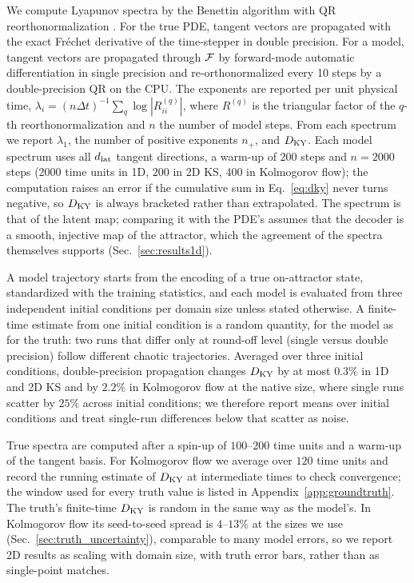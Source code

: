 We compute Lyapunov spectra by the Benettin algorithm with QR
reorthonormalization \citep{benettin1980}. For the true PDE, tangent
vectors are propagated with the exact Fr\'echet derivative of the
time-stepper in double precision. For a model, tangent vectors are
propagated through $\mathcal{F}$ by forward-mode automatic differentiation in
single precision and re-orthonormalized every 10 steps by a
double-precision QR on the CPU. The exponents are reported per unit
physical time, $\lambda_i = (n\Delta t)^{-1}\sum_{q}\log|R^{(q)}_{ii}|$,
where $R^{(q)}$ is the triangular factor of the $q$-th reorthonormalization
and $n$ the number of model steps. From each spectrum we report
$\lambda_1$, the number of positive exponents $n_+$, and $D_{\mathrm{KY}}$. Each
model spectrum uses all $d_{\mathrm{lat}}$
tangent directions, a warm-up of 200 steps and $n=2000$ steps (2000 time
units in 1D, 200 in 2D KS, 400 in Kolmogorov flow); the computation
raises an error if the cumulative sum in Eq.~\eqref{eq:dky} never turns
negative, so $D_{\mathrm{KY}}$ is always bracketed rather than extrapolated. The
spectrum is that of the latent map; comparing it with the PDE's assumes
that the decoder is a smooth, injective map of the attractor, which the
agreement of the spectra themselves supports (Sec.~\ref{sec:results1d}).

A model trajectory starts from the encoding of a true on-attractor
state, standardized with the training statistics, and each model is
evaluated from three independent initial conditions per domain size
unless stated otherwise. A finite-time estimate from one initial
condition is a random quantity, for the model as for the truth: two runs
that differ only at round-off level (single versus double precision)
follow different chaotic trajectories. Averaged over three initial
conditions, double-precision propagation changes $D_{\mathrm{KY}}$ by at most
$0.3\%$ in 1D and 2D KS and by $2.2\%$ in Kolmogorov flow at the native
size, where single runs scatter by $25\%$ across initial conditions; we
therefore report means over initial conditions and treat single-run
differences below that scatter as noise.

True spectra are computed after a spin-up of $100$--$200$ time units and
a warm-up of the tangent basis. For Kolmogorov flow we average over $120$
time units and record the running estimate of $D_{\mathrm{KY}}$ at intermediate
times to check convergence; the window used for every truth value is
listed in Appendix~\ref{app:groundtruth}. The truth's finite-time $D_{\mathrm{KY}}$ is
random in the same way as the model's. In Kolmogorov flow its
seed-to-seed spread is $4$--$13\%$ at the sizes we use
(Sec.~\ref{sec:truth_uncertainty}), comparable to many model errors, so we
report 2D results as scaling with domain size, with truth error bars,
rather than as single-point matches.


